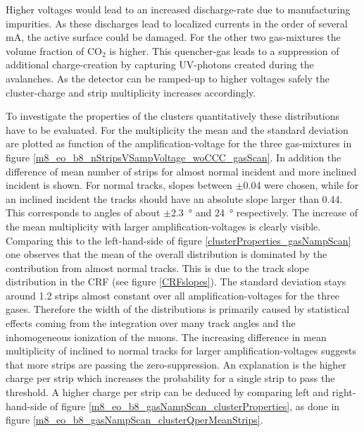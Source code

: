 \documentclass[
twoside,            %
BCOR1.4cm,          %
10pt,               %
headings=normal,    %
headsepline,        %
clearplainpage,		%
final,              %
div=14,
open=right,
bibliography=toc
]{scrreprt}
\begin{document}
Higher voltages would lead to an increased discharge-rate due to manufacturing impurities.
As these discharges lead to localized currents in the order of several \si{\milli\ampere}, the active surface could be damaged.
For the other two gas-mixtures the volume fraction of CO$_{2}$ is higher.
This quencher-gas leads to a suppression of additional charge-creation by capturing UV-photons created during the avalanches.
As the detector can be ramped-up to higher voltages safely the cluster-charge and strip multiplicity increases accordingly.

To investigate the properties of the clusters quantitatively these distributions have to be evaluated.
For the multiplicity the mean and the standard deviation are plotted as function of the amplification-voltage for the three gas-mixtures in figure \ref{m8_eo_b8_nStripsVSampVoltage_woCCC_gasScan}.
In addition the difference of mean number of strips for almost normal incident and more inclined incident is shown.
For normal tracks, slopes between $\pm$0.04 were chosen, while for an inclined incident the tracks should have an absolute slope larger than 0.44.
This corresponds to angles of about $\pm$\SI{2.3}{\degree} and \SI{24}{\degree} respectively.
The increase of the mean multiplicity with larger amplification-voltages is clearly visible.
Comparing this to the left-hand-side of figure \ref{clusterProperties_gasNampScan} one observes that the mean of the overall distribution is dominated by the contribution from almost normal tracks.
This is due to the track slope distribution in the CRF (see figure \ref{CRFslopes}).
The standard deviation stays around 1.2 strips almost constant over all amplification-voltages for the three gases.
Therefore the width of the distributions is primarily caused by statistical effects coming from the integration over many track angles and the inhomogeneous ionization of the muons.
The increasing difference in mean multiplicity of inclined to normal tracks for larger amplification-voltages suggests that more strips are passing the zero-suppression.
An explanation is the higher charge per strip which increases the probability for a single strip to pass the threshold.
A higher charge per strip can be deduced by comparing left and right-hand-side of figure \ref{m8_eo_b8_gasNampScan_clusterProperties}, as done in figure \ref{m8_eo_b8_gasNampScan_clusterQperMeanStrips}.
\end{document}
